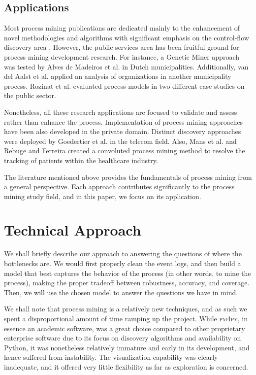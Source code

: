 \documentclass[conference]{IEEEtran}
\begin{document}
\subsection{Applications}

Most process mining publications are dedicated mainly to the enhancement
of novel methodologies and algorithms with significant emphasis on the
control-flow discovery area \cite{van2004}. However, the public services area
has been fruitful ground
for process mining development research. For instance, a
Genetic Miner approach was tested by Alves de Madeiros et al. \cite{deMe2007}
in Dutch municipalities. Additionally, van del Aalst et al. \cite{RoDJ2009}
applied an analysis of organizations in another municipality process.
Rozinat et al. \cite{RoMa2009} evaluated process models in two different case
studies on the public sector.

Nonetheless, all these research
applications are focused to validate and assess rather than enhance the
process. Implementation of process mining approaches have been also
developed in the private domain. Distinct discovery approaches were
deployed by Goedertier et al. \cite{GoDW2011} in the telecom field. Also, Mans
et al. \cite{MaSc2008} and Rebuge and Ferreira \cite{ReBu2012} created a convoluted
process mining method to resolve the tracking of patients within the
healthcare industry.

The literature mentioned above provides the fundamentals of process mining from a general perspective. Each approach contributes significantly to the process mining study field, and in this paper, we focus on its application. 

\section{Technical Approach}
\label{section-technical}

We shall briefly describe our approach to answering the questions of
where the bottlenecks are. We would first properly clean the event logs,
and then build a model that best captures the behavior of the
process (in other words, to mine the process), making the proper tradeoff
between robustness, accuracy, and coverage.  Then, we will use the
chosen model to answer the questions we have in mind.

We shall note that process mining is a relatively new techniques, and
as such we spent a disproportional amount of time ramping up the project.
While \textsc{pm4py}, in essence an academic software,
was a great choice compared to other proprietary enterprise software
due to its focus on discovery algorithms and availability on Python,
it was nonetheless relatively immature and early in its development, and
hence suffered from instability. The visualization capability was clearly
inadequate, and it offered very little flexibility as far as exploration
is concerned.
\end{document}
